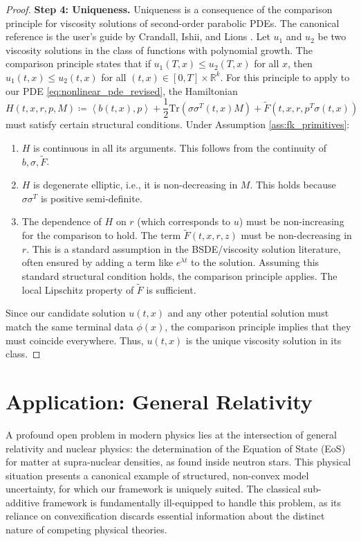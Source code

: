 \documentclass[12pt, letterpaper]{amsart}
\newcommand{\R}{\mathbb{R}}
\newcommand{\scpr}[2]{\left\langle #1, #2 \right\rangle}
\newcommand{\Tr}{\mathrm{Tr}}
\theoremstyle{plain}
\theoremstyle{definition}
\theoremstyle{remark}
\numberwithin{equation}{section} %
\begin{document}
\begin{proof}
\vspace{1ex}
\noindent\textbf{Step 4: Uniqueness.}
Uniqueness is a consequence of the comparison principle for viscosity solutions of second-order parabolic PDEs. The canonical reference is the user's guide by Crandall, Ishii, and Lions \cite{CrandallIshiiLions1992}.
Let $u_1$ and $u_2$ be two viscosity solutions in the class of functions with polynomial growth. The comparison principle states that if $u_1(T,x) \le u_2(T,x)$ for all $x$, then $u_1(t,x) \le u_2(t,x)$ for all $(t,x) \in [0,T]\times\R^k$.
For this principle to apply to our PDE \eqref{eq:nonlinear_pde_revised}, the Hamiltonian
\[ H(t,x,r,p,M) \coloneqq \scpr{b(t,x)}{p} + \frac{1}{2}\Tr(\sigma\sigma^T(t,x) M) + \tilde{F}(t,x,r,p^T\sigma(t,x)) \]
must satisfy certain structural conditions. Under Assumption \ref{ass:fk_primitives}:
\begin{enumerate}
    \item $H$ is continuous in all its arguments. This follows from the continuity of $b, \sigma, \tilde{F}$.
    \item $H$ is degenerate elliptic, i.e., it is non-decreasing in $M$. This holds because $\sigma\sigma^T$ is positive semi-definite.
    \item The dependence of $H$ on $r$ (which corresponds to $u$) must be non-increasing for the comparison to hold. The term $\tilde{F}(t,x,r,z)$ must be non-decreasing in $r$. This is a standard assumption in the BSDE/viscosity solution literature, often ensured by adding a term like $e^{\lambda t}$ to the solution. Assuming this standard structural condition holds, the comparison principle applies. The local Lipschitz property of $\tilde{F}$ is sufficient.
\end{enumerate}
Since our candidate solution $u(t,x)$ and any other potential solution must match the same terminal data $\phi(x)$, the comparison principle implies that they must coincide everywhere. Thus, $u(t,x)$ is the unique viscosity solution in its class.
\end{proof}

\section{Application: General Relativity}

\label{sec:application_gr}

A profound open problem in modern physics lies at the intersection of general relativity and nuclear physics: the determination of the Equation of State (EoS) for matter at supra-nuclear densities, as found inside neutron stars. This physical situation presents a canonical example of structured, non-convex model uncertainty, for which our framework is uniquely suited. The classical sub-additive framework is fundamentally ill-equipped to handle this problem, as its reliance on convexification discards essential information about the distinct nature of competing physical theories.
\end{document}

